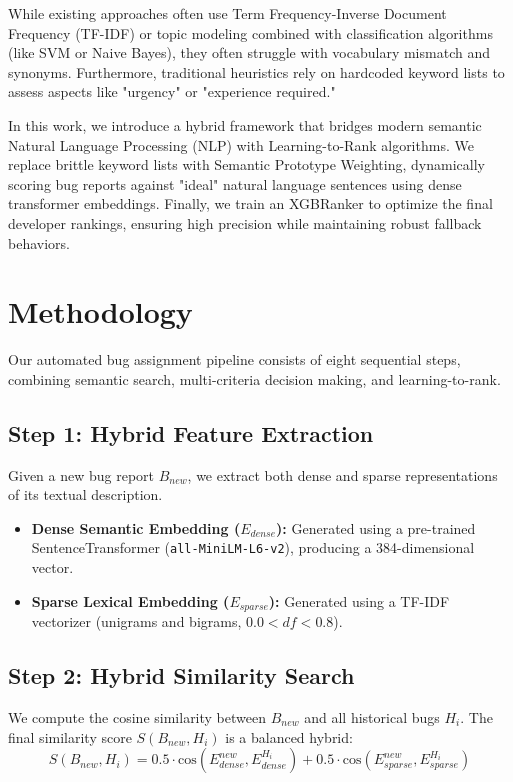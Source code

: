 \documentclass[conference]{IEEEtran}
\begin{document}
While existing approaches often use Term Frequency-Inverse Document Frequency (TF-IDF) or topic modeling combined with classification algorithms (like SVM or Naive Bayes), they often struggle with vocabulary mismatch and synonyms. Furthermore, traditional heuristics rely on hardcoded keyword lists to assess aspects like "urgency" or "experience required." 

In this work, we introduce a hybrid framework that bridges modern semantic Natural Language Processing (NLP) with Learning-to-Rank algorithms. We replace brittle keyword lists with Semantic Prototype Weighting, dynamically scoring bug reports against "ideal" natural language sentences using dense transformer embeddings. Finally, we train an XGBRanker to optimize the final developer rankings, ensuring high precision while maintaining robust fallback behaviors.

\section{Methodology}
Our automated bug assignment pipeline consists of eight sequential steps, combining semantic search, multi-criteria decision making, and learning-to-rank.

\subsection{Step 1: Hybrid Feature Extraction}
Given a new bug report $B_{new}$, we extract both dense and sparse representations of its textual description. 
\begin{itemize}
    \item \textbf{Dense Semantic Embedding ($E_{dense}$):} Generated using a pre-trained SentenceTransformer (\texttt{all-MiniLM-L6-v2}), producing a 384-dimensional vector.
    \item \textbf{Sparse Lexical Embedding ($E_{sparse}$):} Generated using a TF-IDF vectorizer (unigrams and bigrams, $0.0 < df < 0.8$).
\end{itemize}

\subsection{Step 2: Hybrid Similarity Search}
We compute the cosine similarity between $B_{new}$ and all historical bugs $H_i$. The final similarity score $S(B_{new}, H_i)$ is a balanced hybrid:
\begin{equation}
S(B_{new}, H_i) = 0.5 \cdot \text{cos}(E_{dense}^{new}, E_{dense}^{H_i}) + 0.5 \cdot \text{cos}(E_{sparse}^{new}, E_{sparse}^{H_i})
\end{equation}
\end{document}
